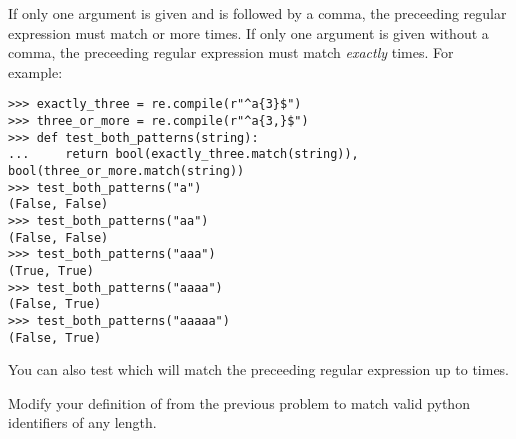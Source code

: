If only one argument  is given and is followed by a comma, the preceeding regular expression must match  or more times. If only one argument  is given without a comma, the preceeding regular expression must match \emph{exactly}  times.
For example:
\begin{lstlisting}
>>> exactly_three = re.compile(r"^a{3}$")
>>> three_or_more = re.compile(r"^a{3,}$")
>>> def test_both_patterns(string):
...     return bool(exactly_three.match(string)), bool(three_or_more.match(string))
>>> test_both_patterns("a")
(False, False)
>>> test_both_patterns("aa")
(False, False)
>>> test_both_patterns("aaa")
(True, True)
>>> test_both_patterns("aaaa")
(False, True)
>>> test_both_patterns("aaaaa")
(False, True)
\end{lstlisting}
You can also test  which will match the preceeding regular expression up to  times.

\begin{problem}
Modify your definition of  from the previous problem to match valid python identifiers of any length.
\end{problem}


\begin{comment}
\begin{problem}
A \emph{valid python parameter definition} is defined as the concatenation of the following strings:
\begin{itemize}
    \item any valid python identifier
    \item any number of spaces
    \item (optional) an equals sign followed by any number of spaces and ending with one of the following: any real number, a single quote followed by any number of non-single-quote characters followed by a single quote, or any valid python identifier
\end{itemize}

Define a variable \li{parameter_pattern_string} that defines a regular expression that matches valid python parameter definitions.

For example, each element of \li{["max=4.2", "string= ''", "num_guesses", "msg ='\\\\'", "volume_fn=_CALC_VOLUME"]} is a valid python parameter definition, while each element of \li{["300", "no spaces", "is_4=(value==4)", "pattern = r'^one|two fish$'", 'string="these last two are actually valid in python, but they should not be matched by your pattern"']} is not. %
\end{problem}
\end{comment}


